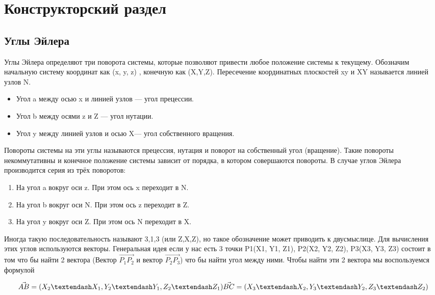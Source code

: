 \chapter{Конструкторский раздел}


\section{Углы Эйлера}
\hspace{0.6cm} Углы Эйлера определяют три поворота системы, которые позволяют привести любое положение системы к текущему. Обозначим начальную систему координат как (x, y, z) , конечную как (X,Y,Z). Пересечение координатных плоскостей xy и XY называется линией узлов N.
\begin{itemize}
	\item Угол a между осью x и линией узлов — угол прецессии.
	\item Угол b между осями z и Z — угол нутации.
	\item Угол y между линией узлов и осью  X— угол собственного вращения.
\end{itemize}

\hspace{0.6cm} Повороты системы на эти углы называются прецессия, нутация и поворот на собственный угол (вращение). Такие повороты некоммутативны и конечное положение системы зависит от порядка, в котором совершаются повороты. В случае углов Эйлера производится серия из трёх поворотов:
\begin{enumerate}
	\item На угол a вокруг оси z. При этом ось x переходит в N.
	\item На угол b вокруг оси N. При этом ось z переходит в Z.
	\item На угол y вокруг оси Z. При этом ось N переходит в X.
\end{enumerate}

\hspace{0.6cm} Иногда такую последовательность называют 3,1,3 (или Z,X,Z), но такое обозначение может приводить к двусмыслице.
\hspace{0.6cm} Для вычисления этих углов используются векторы. Генеральная идея если у нас есть 3 точки P1(X1, Y1, Z1),  P2(X2, Y2, Z2),  P3(X3, Y3, Z3) состоит в том что бы найти 2 вектора (Вектор $\vec{P_{1}P_{2}}$ и вектор $\vec{P_{2}P_{3}}$) что бы найти угол между ними. Чтобы найти эти 2 вектора мы воспользуемся формулой

\begin{equation} 
\displaystyle \vec{AB} = (X_2 – X_1, Y_2 – Y_1, Z_2 – Z_1)\\
\vec{BC} = (X_3 – X_2, Y_3 – Y_2, Z_3 – Z_2) 
\end{equation}

